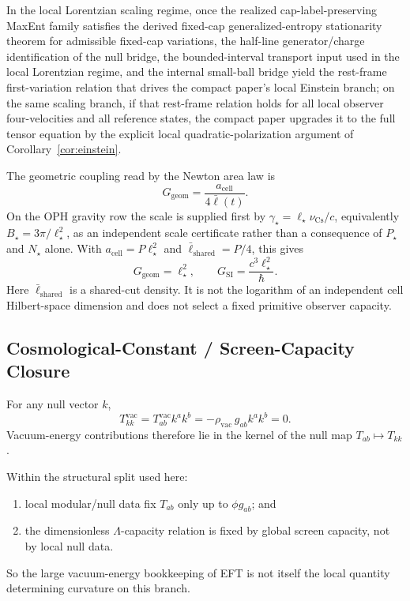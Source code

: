 \begin{theorem}
In the local Lorentzian scaling regime, once the realized cap-label-preserving MaxEnt family satisfies the derived fixed-cap generalized-entropy stationarity theorem for admissible fixed-cap variations, the half-line
generator/charge identification of the null bridge, the bounded-interval transport input used in
the local Lorentzian regime, and the internal small-ball bridge yield the rest-frame first-variation
relation that drives the compact paper's local Einstein branch; on the same scaling branch, if that
rest-frame relation holds for all local observer four-velocities and all reference states, the
compact paper upgrades it to the full tensor equation by the explicit local quadratic-polarization
argument of Corollary~\ref{cor:einstein}.
\end{theorem}

\begin{theorem}
The geometric coupling read by the Newton area law is
\[
G_{\mathrm{geom}}=\frac{a_{\mathrm{cell}}}{4\bar{\ell}(t)}.
\]
On the OPH gravity row the scale is supplied first by
\(\gamma_\star=\ell_\star\nu_{\mathrm{Cs}}/c\), equivalently
\(B_\star=3\pi/\ell_\star^2\), as an independent scale certificate rather than a consequence of
\(P_\star\) and \(N_\star\) alone. With
\(a_{\mathrm{cell}}=P\ell_\star^2\) and \(\bar{\ell}_{\mathrm{shared}}=P/4\), this gives
\[
G_{\mathrm{geom}}=\ell_\star^2,
\qquad
G_{\mathrm{SI}}=\frac{c^3\ell_\star^2}{\hbar}.
\]
Here \(\bar{\ell}_{\mathrm{shared}}\) is a shared-cut density. It is not the logarithm of an
independent cell Hilbert-space dimension and does not select a fixed primitive observer capacity.
\end{theorem}

\subsection{Cosmological-Constant / Screen-Capacity Closure}

\begin{lemma}
For any null vector \(k\),
\[
T^{\mathrm{vac}}_{kk}
=
T^{\mathrm{vac}}_{ab}k^ak^b
=
-\rho_{\mathrm{vac}}\,g_{ab}k^ak^b
=
0.
\]
Vacuum-energy contributions therefore lie in the kernel of the null map
\(T_{ab}\mapsto T_{kk}\).
\end{lemma}

\begin{proposition}
Within the structural split used here:
\begin{enumerate}[leftmargin=2em]
\item local modular/null data fix \(T_{ab}\) only up to \(\phi g_{ab}\); and
\item the dimensionless \(\Lambda\)-capacity relation is fixed by global screen capacity, not by local null data.
\end{enumerate}
So the large vacuum-energy bookkeeping of EFT is not itself the local quantity determining
curvature on this branch.
\end{proposition}

